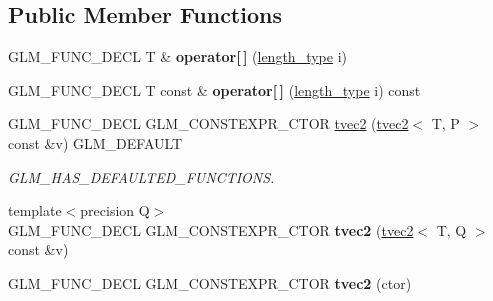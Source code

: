 \subsection*{Public Member Functions}
\begin{DoxyCompactItemize}
\item 
\mbox{\label{structglm_1_1tvec2_a70383ca2702ecf4d4ff41063de68594d}} 
G\+L\+M\+\_\+\+F\+U\+N\+C\+\_\+\+D\+E\+CL T \& {\bfseries operator\mbox{[}$\,$\mbox{]}} (\hyperlink{structglm_1_1tvec2_a5a5ddebab821a3cf9185772386afbe8d}{length\+\_\+type} i)
\item 
\mbox{\label{structglm_1_1tvec2_ac33b4e2caff661fba68f07e19a7d499f}} 
G\+L\+M\+\_\+\+F\+U\+N\+C\+\_\+\+D\+E\+CL T const  \& {\bfseries operator\mbox{[}$\,$\mbox{]}} (\hyperlink{structglm_1_1tvec2_a5a5ddebab821a3cf9185772386afbe8d}{length\+\_\+type} i) const
\item 
\mbox{\label{structglm_1_1tvec2_a3c688d3927a3e5e9f30039ce50387727}} 
G\+L\+M\+\_\+\+F\+U\+N\+C\+\_\+\+D\+E\+CL G\+L\+M\+\_\+\+C\+O\+N\+S\+T\+E\+X\+P\+R\+\_\+\+C\+T\+OR \hyperlink{structglm_1_1tvec2_a3c688d3927a3e5e9f30039ce50387727}{tvec2} (\hyperlink{structglm_1_1tvec2}{tvec2}$<$ T, P $>$ const \&v) G\+L\+M\+\_\+\+D\+E\+F\+A\+U\+LT
\begin{DoxyCompactList}\small\item\em G\+L\+M\+\_\+\+H\+A\+S\+\_\+\+D\+E\+F\+A\+U\+L\+T\+E\+D\+\_\+\+F\+U\+N\+C\+T\+I\+O\+NS. \end{DoxyCompactList}\item 
\mbox{\label{structglm_1_1tvec2_ab5d63947a357697675db31c4a31aebc7}} 
{\footnotesize template$<$precision Q$>$ }\\G\+L\+M\+\_\+\+F\+U\+N\+C\+\_\+\+D\+E\+CL G\+L\+M\+\_\+\+C\+O\+N\+S\+T\+E\+X\+P\+R\+\_\+\+C\+T\+OR {\bfseries tvec2} (\hyperlink{structglm_1_1tvec2}{tvec2}$<$ T, Q $>$ const \&v)
\item 
\mbox{\label{structglm_1_1tvec2_a8874fb6a6421887e236bd3fae0fb44b2}} 
G\+L\+M\+\_\+\+F\+U\+N\+C\+\_\+\+D\+E\+CL G\+L\+M\+\_\+\+C\+O\+N\+S\+T\+E\+X\+P\+R\+\_\+\+C\+T\+OR {\bfseries tvec2} (ctor)
\item 
\mbox{\label{structglm_1_1tvec2_afa741b140588f0be3ceb59ec2b139e34}} 

\end{DoxyCompactItemize}

